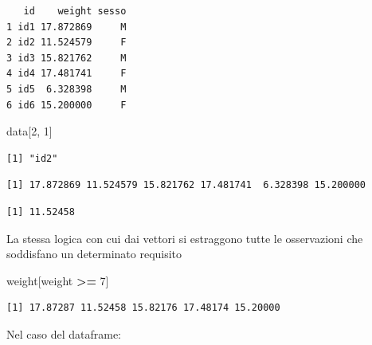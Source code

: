 \documentclass[
  a4paper,
  DIV=11,
  numbers=noendperiod]{scrreprt}
\newenvironment{Shaded}{\begin{snugshade}}{\end{snugshade}}
\newcommand{\DecValTok}[1]{\textcolor[rgb]{0.00,0.00,0.81}{#1}}
\newcommand{\NormalTok}[1]{#1}
\newcommand{\SpecialCharTok}[1]{\textcolor[rgb]{0.81,0.36,0.00}{\textbf{#1}}}
\begin{document}
\begin{verbatim}
   id    weight sesso
1 id1 17.872869     M
2 id2 11.524579     F
3 id3 15.821762     M
4 id4 17.481741     F
5 id5  6.328398     M
6 id6 15.200000     F
\end{verbatim}

\begin{Shaded}
\begin{Highlighting}[]
\NormalTok{data[}\DecValTok{2}\NormalTok{, }\DecValTok{1}\NormalTok{]}
\end{Highlighting}
\end{Shaded}

\begin{verbatim}
[1] "id2"
\end{verbatim}

\begin{Shaded}
\end{Shaded}

\begin{verbatim}
[1] 17.872869 11.524579 15.821762 17.481741  6.328398 15.200000
\end{verbatim}

\begin{Shaded}
\end{Shaded}

\begin{verbatim}
[1] 11.52458
\end{verbatim}

La stessa logica con cui dai vettori si estraggono tutte le osservazioni
che soddisfano un determinato requisito

\begin{Shaded}
\begin{Highlighting}[]
\NormalTok{weight[weight }\SpecialCharTok{\textgreater{}=} \DecValTok{7}\NormalTok{]}
\end{Highlighting}
\end{Shaded}

\begin{verbatim}
[1] 17.87287 11.52458 15.82176 17.48174 15.20000
\end{verbatim}

Nel caso del dataframe:
\end{document}
